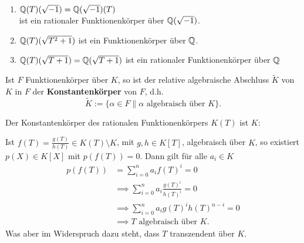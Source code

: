 \begin{beispiel}
    \begin{enumerate}[label=\alph*)]
        \item $\mathbb{Q}(T)(\sqrt{-1}) = \mathbb{Q}(\sqrt{-1})(T)$\\
        ist ein rationaler Funktionenkörper über $\mathbb{Q}(\sqrt{-1})$. 
        
        \item $\mathbb{Q}(T)(\sqrt{T^2+1})$ ist ein Funktionenkörper über $\mathbb{Q}$.

        \item $\mathbb{Q}(T)(\sqrt{T+1}) = \mathbb{Q}(\sqrt{T+1})$ ist ein rationaler Funktionenkörper über $\mathbb{Q}$ 
    \end{enumerate}
\end{beispiel}

\begin{definition}
    Ist $F$ Funktionenkörper über $K$, 
    so ist der relative algebraische Abschluss $\tilde{K}$ von $K$ in $F$ der 
    \textbf{Konstantenkörper} von $F$, d.h.
    $$ \tilde{K} := \{\alpha \in F \| \alpha \text{ algebraisch  über } K\}.$$
\end{definition}

\begin{beispiel}\label{beispiel:1.7}
    Der Konstantenkörper des rationalen Funktionenkörpers $K(T)$ ist $K$:

    Ist $f(T) = \frac{g(T)}{h(T)} \in K(T) \setminus K$, mit $g,h \in K[T]$, algebraisch über $K$,
    so existiert $p(X) \in K[X]$ mit $p(f(T)) = 0$. Dann gilt für alle $a_i \in K$
    \begin{align*}
        p(f(T)) &= \sum\limits_{i=0}^n a_i f(T)^i = 0\\
        & \implies \sum\limits_{i=0}^n a_i \frac{g(T)^i}{h(T)^i} = 0\\
        & \implies \sum\limits_{i=0}^n a_i g(T)^i h(T)^{n-i} = 0 \\
        & \implies T \text{ algebraisch über } K.
    \end{align*}
    Was aber im Widerspruch dazu steht, dass $T$ transzendent über $K$.
\end{beispiel}

